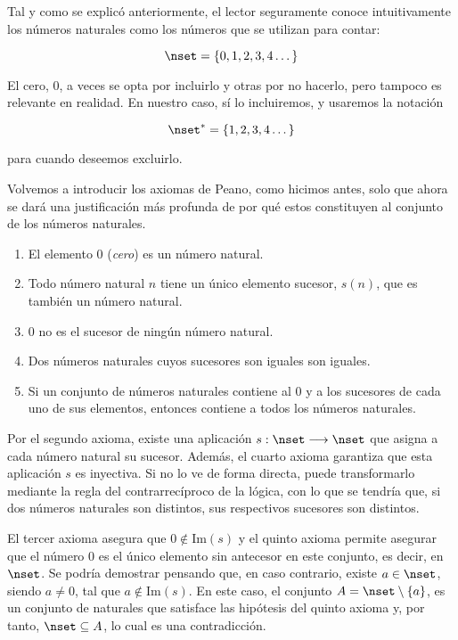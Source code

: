 



Tal y como se explicó anteriormente, el lector seguramente conoce
intuitivamente los números naturales como los números que se utilizan para
contar:

$$ \nset = \{0, 1, 2, 3, 4 \dots\} $$

\noindent El cero, 0, a veces se opta por incluirlo y otras por no hacerlo,
pero tampoco es relevante en realidad. En nuestro caso, sí lo incluiremos, y
usaremos la notación

$$ \nset^* = \{1, 2, 3, 4 \dots\} $$

\noindent para cuando deseemos excluirlo.

Volvemos a introducir los axiomas de Peano, como hicimos antes, solo que
ahora se dará una justificación más profunda de por qué estos constituyen al
conjunto de los números naturales.

\begin{enumerate}[label=\textbf{A\arabic*.}, leftmargin=1.5cm]
  \item El elemento 0 (\emph{cero}) es un número natural.
  \item Todo número natural $n$ tiene un único elemento sucesor, $s(n)$, que
    es también un número natural.
  \item 0 no es el sucesor de ningún número natural.
  \item Dos números naturales cuyos sucesores son iguales son iguales.
  \item Si un conjunto de números naturales contiene al 0 y a los sucesores
    de cada uno de sus elementos, entonces contiene a todos los números
    naturales.
\end{enumerate}

Por el segundo axioma, existe una aplicación $s: \nset \longrightarrow
\nset$ que asigna a cada número natural su sucesor. Además, el cuarto axioma
garantiza que esta aplicación $s$ es inyectiva. Si no lo ve de forma
directa, puede transformarlo mediante la regla del contrarrecíproco de la
lógica, con lo que se tendría que, si dos números naturales son distintos,
sus respectivos sucesores son distintos.


El tercer axioma asegura que $0 \notin \text{Im}(s)$ y el quinto axioma
permite asegurar que el número 0 es el único elemento sin antecesor en este
conjunto, es decir, en $\nset$. Se podría demostrar pensando que, en caso
contrario, existe $a \in \nset$, siendo $a \neq 0$, tal que $a \notin
\text{Im}(s)$. En este caso, el conjunto $A = \nset \setminus \{a\}$, es un
conjunto de naturales que satisface las hipótesis del quinto axioma y, por
tanto, $\nset \subseteq A$, lo cual es una contradicción.

